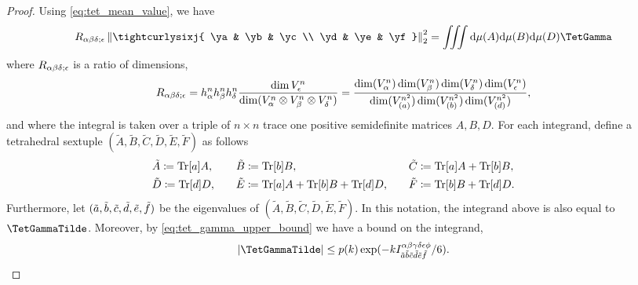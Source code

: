 \documentclass[notitlepage, 10pt]{article}
\begin{document}
\begin{proof}
    Using \cref{eq:tet_mean_value}, we have
    \begin{align}
        R_{\ya\yb\yd;\ye}\norm{\tightcurlysixj{ \ya & \yb & \yc \\ \yd & \ye & \yf}}_{2}^2
        =
        \iiint \diff \mu(A)\diff \mu(B)\diff \mu(D)\TetGamma
    \end{align}
    where $R_{\alpha\beta\delta;\epsilon}$ is a ratio of dimensions,
    \begin{equation}
        R_{\alpha\beta\delta;\epsilon} 
        = h^n_\alpha h^n_\beta h^n_\delta \frac{\dim V_\epsilon^n}{\dim(V_{\alpha}^n \otimes V_{\beta}^n \otimes V_{\delta}^n)}
        =     \frac{\dim(V_{\alpha}^{n})\dim(V_{\beta}^{n})\dim(V_{\delta}^{n})\dim(V_{\epsilon}^{n})}{\dim(V_{(a)}^{n^2})\dim(V_{(b)}^{n^2})\dim(V_{(d)}^{n^2})},
    \end{equation}
    and where the integral is taken over a triple of $n\times n$ trace one positive semidefinite matrices $A, B, D$.
    For each integrand, define a tetrahedral sextuple $(\tilde A,\tilde B,\tilde C,\tilde D,\tilde E,\tilde F)$ as follows
    \begin{equation}
        \label{eq:tilde_defns}
        \begin{alignedat}{3}
            &\tilde A \coloneqq {\operatorname{Tr}[a]}A, \qquad
            &&\tilde B \coloneqq {\operatorname{Tr}[b]}B, \qquad
            &&\tilde C \coloneqq {\operatorname{Tr}[a]}A+{\operatorname{Tr}[b]}B, \qquad \\
            &\tilde D \coloneqq {\operatorname{Tr}[d]}D, \qquad
            &&\tilde E \coloneqq {\operatorname{Tr}[a]}A+{\operatorname{Tr}[b]}B+{\operatorname{Tr}[d]}D, \qquad
            &&\tilde F \coloneqq {\operatorname{Tr}[b]}B + {\operatorname{Tr}[d]}D.
        \end{alignedat}
    \end{equation}
    Furthermore, let $(\tilde {a}, \tilde {b}, \tilde {c}, \tilde {d}, \tilde {e}, \tilde {f})$ be the eigenvalues of $(\tilde A, \tilde B, \tilde C, \tilde D, \tilde E, \tilde F)$.
    In this notation, the integrand above is also equal to $\TetGammaTilde$.
    Moreover, by \cref{eq:tet_gamma_upper_bound} we have a bound on the integrand,
    \begin{equation}
        \abs{\TetGammaTilde} \leq p(k) \exp(-k I^{\ya\yb\yc\yd\ye\yf}_{\tilde \ea \tilde \eb\tilde \ec\tilde \ed\tilde \ee\tilde \ef}/6).
    \end{equation}

\end{proof}
\end{document}
